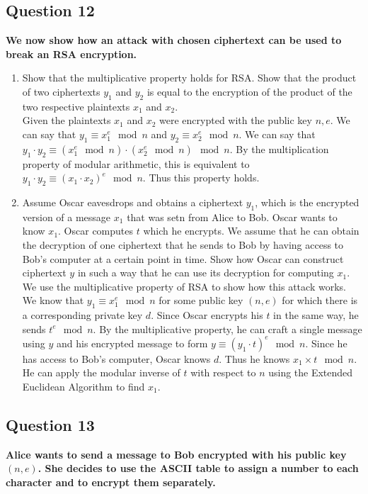 \documentclass[titlepage]{article}
\begin{document}
{\subsection{Question 12}
{
\textbf{We now show how an attack with chosen ciphertext can be used to break an RSA encryption.}
\begin{enumerate}
    \item Show that the multiplicative property holds for RSA. Show that the product of two ciphertexts \(y_1\) and \(y_2\) is equal to the encryption of the product of the two respective plaintexts \(x_1\) and \(x_2\).\\Given the plaintexts \(x_1\) and \(x_2\) were encrypted with the public key \(n, e\). We can say that \(y_1 \equiv x_1^e \mod n\) and \(y_2 \equiv x_2^e \mod n\). We can say that \(y_1 \cdot y_2 \equiv (x_1^e \mod n) \cdot (x_2^e \mod n) \mod n\). By the multiplication property of modular arithmetic, this is equivalent to \(y_1 \cdot y_2 \equiv (x_1 \cdot x_2)^e \mod n\). Thus this property holds.
    \item Assume Oscar eavesdrops and obtains a ciphertext \(y_1\), which is the encrypted version of a message \(x_1\) that was setn from Alice to Bob. Oscar wants to know \(x_1\). Oscar computes \(t\) which he encrypts. We assume that he can obtain the decryption of one ciphertext that he sends to Bob by having access to Bob's computer at a certain point in time. Show how Oscar can construct ciphertext \(y\) in such a way that he can use its decryption for computing \(x_1\).\\We use the multiplicative property of RSA to show how this attack works. We know that \(y_1 \equiv x_1^e \mod n\) for some public key \((n, e)\) for which there is a corresponding private key \(d\). Since Oscar encrypts his \(t\) in the same way, he sends \(t^e \mod n\). By the multiplicative property, he can craft a single message using \(y\) and his encrypted message to form \(y \equiv (y_1 \cdot t)^e \mod n\). Since he has access to Bob's computer, Oscar knows \(d\). Thus he knows \(x_1 \times t \mod n\). He can apply the modular inverse of \(t\) with respect to \(n\) using the Extended Euclidean Algorithm to find \(x_1\).
\end{enumerate}
}
\subsection{Question 13}
{
\textbf{Alice wants to send a message to Bob encrypted with his public key \((n, e)\). She decides to use the ASCII table to assign a number to each character and to encrypt them separately.}
}}
\end{document}
